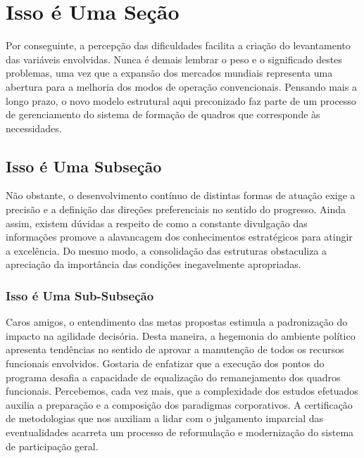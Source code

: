 \documentclass[fleqn]{icat-ufal}
\begin{document}
\section{Isso é Uma Seção}
\label{sec:isso_e_uma_secao}

Por conseguinte, a percepção das dificuldades facilita a criação do levantamento
das variáveis envolvidas. Nunca é demais lembrar o peso e o significado destes
problemas, uma vez que a expansão dos mercados mundiais representa uma abertura
para a melhoria dos modos de operação convencionais. Pensando mais a longo
prazo, o novo modelo estrutural aqui preconizado faz parte de um processo de
gerenciamento do sistema de formação de quadros que corresponde às necessidades. 

\subsection{Isso é Uma Subseção}
\label{sec:isso_e_uma_subsecao}

Não obstante, o desenvolvimento contínuo de distintas formas de atuação exige a
precisão e a definição das direções preferenciais no sentido do progresso. Ainda
assim, existem dúvidas a respeito de como a constante divulgação das informações
promove a alavancagem dos conhecimentos estratégicos para atingir a excelência.
Do mesmo modo, a consolidação das estruturas obstaculiza a apreciação da
importância das condições inegavelmente apropriadas. 

\subsubsection{Isso é Uma Sub-Subseção}
\label{sec:isso_e_uma_subsubsecao}

Caros amigos, o entendimento das metas propostas estimula a padronização do
impacto na agilidade decisória. Desta maneira, a hegemonia do ambiente político
apresenta tendências no sentido de aprovar a manutenção de todos os recursos
funcionais envolvidos. Gostaria de enfatizar que a execução dos pontos do
programa desafia a capacidade de equalização do remanejamento dos quadros
funcionais. Percebemos, cada vez mais, que a complexidade dos estudos efetuados
auxilia a preparação e a composição dos paradigmas corporativos. A certificação
de metodologias que nos auxiliam a lidar com o julgamento imparcial das
eventualidades acarreta um processo de reformulação e modernização do sistema de
participação geral. 
\end{document}

